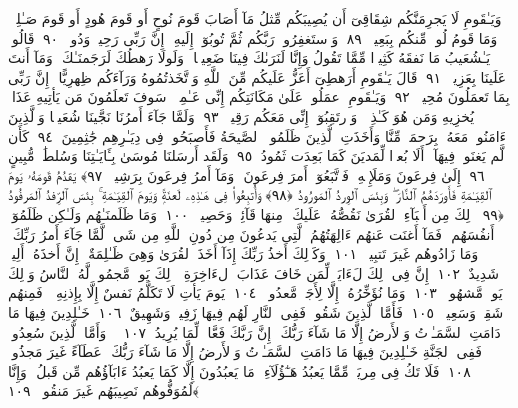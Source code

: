  وَيَـٰقَومِ لَا يَجرِمَنَّكُم شِقَاقِىٓ أَن يُصِيبَكُم مِّثلُ مَآ أَصَابَ قَومَ نُوحٍ أَو قَومَ هُودٍ أَو قَومَ صَـٰلِحٍۢ ۚ وَمَا قَومُ لُوطٍۢ مِّنكُم بِبَعِيدٍۢ ﴿٨٩﴾
 وَٱستَغفِرُوا۟ رَبَّكُم ثُمَّ تُوبُوٓا۟ إِلَيهِ ۚ إِنَّ رَبِّى رَحِيمٌۭ وَدُودٌۭ ﴿٩٠﴾
 قَالُوا۟ يَـٰشُعَيبُ مَا نَفقَهُ كَثِيرًۭا مِّمَّا تَقُولُ وَإِنَّا لَنَرَىٰكَ فِينَا ضَعِيفًۭا ۖ وَلَولَا رَهطُكَ لَرَجَمنَـٰكَ ۖ وَمَآ أَنتَ عَلَينَا بِعَزِيزٍۢ ﴿٩١﴾
 قَالَ يَـٰقَومِ أَرَهطِىٓ أَعَزُّ عَلَيكُم مِّنَ ٱللَّهِ وَٱتَّخَذتُمُوهُ وَرَآءَكُم ظِهرِيًّا ۖ إِنَّ رَبِّى بِمَا تَعمَلُونَ مُحِيطٌۭ ﴿٩٢﴾
 وَيَـٰقَومِ ٱعمَلُوا۟ عَلَىٰ مَكَانَتِكُم إِنِّى عَـٰمِلٌۭ ۖ سَوفَ تَعلَمُونَ مَن يَأتِيهِ عَذَابٌۭ يُخزِيهِ وَمَن هُوَ كَـٰذِبٌۭ ۖ وَٱرتَقِبُوٓا۟ إِنِّى مَعَكُم رَقِيبٌۭ ﴿٩٣﴾
 وَلَمَّا جَآءَ أَمرُنَا نَجَّينَا شُعَيبًۭا وَٱلَّذِينَ ءَامَنُوا۟ مَعَهُۥ بِرَحمَةٍۢ مِّنَّا وَأَخَذَتِ ٱلَّذِينَ ظَلَمُوا۟ ٱلصَّيحَةُ فَأَصبَحُوا۟ فِى دِيَـٰرِهِم جَٰثِمِينَ ﴿٩٤﴾
 كَأَن لَّم يَغنَوا۟ فِيهَآ ۗ أَلَا بُعدًۭا لِّمَديَنَ كَمَا بَعِدَت ثَمُودُ ﴿٩٥﴾
 وَلَقَد أَرسَلنَا مُوسَىٰ بِـَٔايَـٰتِنَا وَسُلطَٰنٍۢ مُّبِينٍ ﴿٩٦﴾
 إِلَىٰ فِرعَونَ وَمَلَإِي۟هِۦ فَٱتَّبَعُوٓا۟ أَمرَ فِرعَونَ ۖ وَمَآ أَمرُ فِرعَونَ بِرَشِيدٍۢ ﴿٩٧﴾
 يَقدُمُ قَومَهُۥ يَومَ ٱلقِيَـٰمَةِ فَأَورَدَهُمُ ٱلنَّارَ ۖ وَبِئسَ ٱلوِردُ ٱلمَورُودُ ﴿٩٨﴾
 وَأُتبِعُوا۟ فِى هَـٰذِهِۦ لَعنَةًۭ وَيَومَ ٱلقِيَـٰمَةِ ۚ بِئسَ ٱلرِّفدُ ٱلمَرفُودُ ﴿٩٩﴾
 ذَٟلِكَ مِن أَنۢبَآءِ ٱلقُرَىٰ نَقُصُّهُۥ عَلَيكَ ۖ مِنهَا قَآئِمٌۭ وَحَصِيدٌۭ ﴿١٠٠﴾
 وَمَا ظَلَمنَـٰهُم وَلَـٰكِن ظَلَمُوٓا۟ أَنفُسَهُم ۖ فَمَآ أَغنَت عَنهُم ءَالِهَتُهُمُ ٱلَّتِى يَدعُونَ مِن دُونِ ٱللَّهِ مِن شَىءٍۢ لَّمَّا جَآءَ أَمرُ رَبِّكَ ۖ وَمَا زَادُوهُم غَيرَ تَتبِيبٍۢ ﴿١٠١﴾
 وَكَذَٟلِكَ أَخذُ رَبِّكَ إِذَآ أَخَذَ ٱلقُرَىٰ وَهِىَ ظَـٰلِمَةٌ ۚ إِنَّ أَخذَهُۥٓ أَلِيمٌۭ شَدِيدٌ ﴿١٠٢﴾
 إِنَّ فِى ذَٟلِكَ لَءَايَةًۭ لِّمَن خَافَ عَذَابَ ٱلءَاخِرَةِ ۚ ذَٟلِكَ يَومٌۭ مَّجمُوعٌۭ لَّهُ ٱلنَّاسُ وَذَٟلِكَ يَومٌۭ مَّشهُودٌۭ ﴿١٠٣﴾
 وَمَا نُؤَخِّرُهُۥٓ إِلَّا لِأَجَلٍۢ مَّعدُودٍۢ ﴿١٠٤﴾
 يَومَ يَأتِ لَا تَكَلَّمُ نَفسٌ إِلَّا بِإِذنِهِۦ ۚ فَمِنهُم شَقِىٌّۭ وَسَعِيدٌۭ ﴿١٠٥﴾
 فَأَمَّا ٱلَّذِينَ شَقُوا۟ فَفِى ٱلنَّارِ لَهُم فِيهَا زَفِيرٌۭ وَشَهِيقٌ ﴿١٠٦﴾
 خَـٰلِدِينَ فِيهَا مَا دَامَتِ ٱلسَّمَـٰوَٟتُ وَٱلأَرضُ إِلَّا مَا شَآءَ رَبُّكَ ۚ إِنَّ رَبَّكَ فَعَّالٌۭ لِّمَا يُرِيدُ ﴿١٠٧﴾
 ۞ وَأَمَّا ٱلَّذِينَ سُعِدُوا۟ فَفِى ٱلجَنَّةِ خَـٰلِدِينَ فِيهَا مَا دَامَتِ ٱلسَّمَـٰوَٟتُ وَٱلأَرضُ إِلَّا مَا شَآءَ رَبُّكَ ۖ عَطَآءً غَيرَ مَجذُوذٍۢ ﴿١٠٨﴾
 فَلَا تَكُ فِى مِريَةٍۢ مِّمَّا يَعبُدُ هَـٰٓؤُلَآءِ ۚ مَا يَعبُدُونَ إِلَّا كَمَا يَعبُدُ ءَابَآؤُهُم مِّن قَبلُ ۚ وَإِنَّا لَمُوَفُّوهُم نَصِيبَهُم غَيرَ مَنقُوصٍۢ ﴿١٠٩﴾
